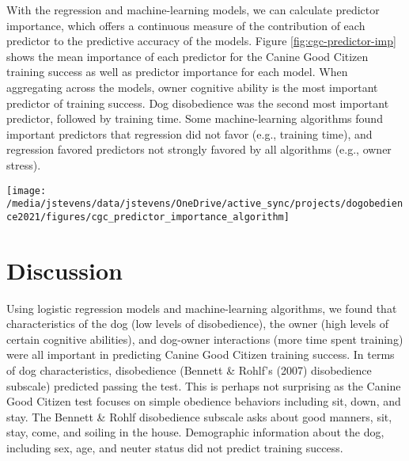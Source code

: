 \documentclass[
  english,
  ,pub,floatsintext]{apa6}
\begin{document}
With the regression and machine-learning models, we can calculate predictor importance, which offers a continuous measure of the contribution of each predictor to the predictive accuracy of the models. Figure \ref{fig:cgc-predictor-imp} shows the mean importance of each predictor for the Canine Good Citizen training success as well as predictor importance for each model. When aggregating across the models, owner cognitive ability is the most important predictor of training success. Dog disobedience was the second most important predictor, followed by training time. Some machine-learning algorithms found important predictors that regression did not favor (e.g., training time), and regression favored predictors not strongly favored by all algorithms (e.g., owner stress).



\begin{figure*}
\texttt{[image: /media/jstevens/data/jstevens/OneDrive/active\_sync/projects/dogobedience2021/figures/cgc\_predictor\_importance\_algorithm]} \caption{Predictor importance for Canine Good Citizen training success. The first panel represents the mean importance over all predictors (predictors ordered by mean importance). The remaining panels show importance for each predictor (panels ordered by predictor accuracy). Closed circles represent importance scores for each model and predictor.}\label{fig:cgc-predictor-imp}
\end{figure*}

\hypertarget{discussion}{%
\section{Discussion}\label{discussion}}

Using logistic regression models and machine-learning algorithms, we found that characteristics of the dog (low levels of disobedience), the owner (high levels of certain cognitive abilities), and dog-owner interactions (more time spent training) were all important in predicting Canine Good Citizen training success. In terms of dog characteristics, disobedience (Bennett \& Rohlf's (2007) disobedience subscale) predicted passing the test. This is perhaps not surprising as the Canine Good Citizen test focuses on simple obedience behaviors including sit, down, and stay. The Bennett \& Rohlf disobedience subscale asks about good manners, sit, stay, come, and soiling in the house. Demographic information about the dog, including sex, age, and neuter status did not predict training success.
\end{document}
